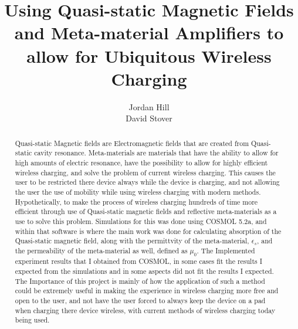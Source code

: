 \documentclass[]{article}
\title{Using Quasi-static Magnetic Fields and Meta-material Amplifiers to allow for Ubiquitous Wireless Charging}
\author{Jordan Hill \\ David Stover}
\begin{document}
	
\maketitle

\pagebreak

\begin{abstract}
Quasi-static Magnetic fields are Electromagnetic fields that are created from Quasi-static cavity resonance. Meta-materials are materials that have the ability to allow for high amounts of electric resonance, have the possibility to allow for highly efficient wireless charging, and solve the problem of current wireless charging. This causes the user to be restricted there device always while the device is charging, and not allowing the user the use of mobility while using wireless charging with modern methods. Hypothetically, to make the process of wireless charging hundreds of time more efficient through use of Quasi-static magnetic fields and reflective meta-materials as a use to solve this problem. Simulations for this was done using COSMOL 5.2a, and within that software is where the main work was done for calculating absorption of the Quasi-static magnetic field, along with the permittvity of the meta-material, $\epsilon_s$, and the permeability of the meta-material as well, defined as $\mu_0$. The Implemented experiment results that I obtained from COSMOL, in some cases fit the results I expected from the simulations and in some aspects did not fit the results I expected. The Importance of this project is mainly of how the application of such a method could be extremely useful in making the experience in wireless charging more free and open to the user, and not have the user forced to always keep the device on a pad when charging there device wireless, with current methods of wireless charging today being used.
\end{abstract}

\pagebreak
\end{document}
